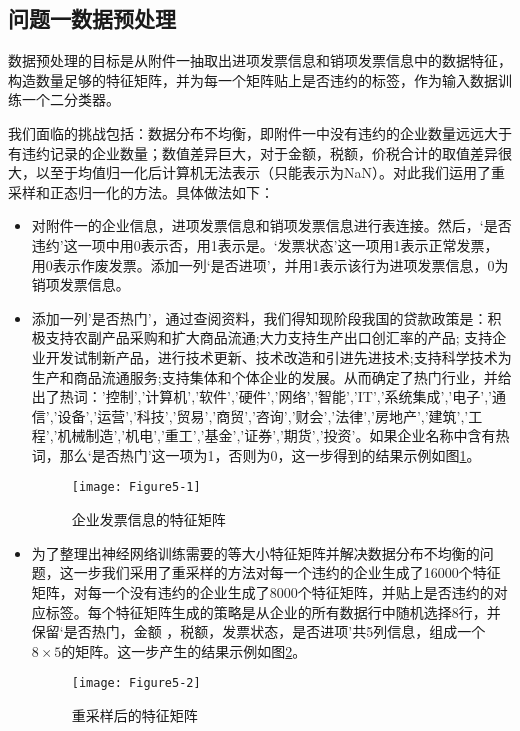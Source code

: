 \documentclass{cumcmthesis}
\begin{document}
\subsection{问题一数据预处理}
数据预处理的目标是从附件一抽取出进项发票信息和销项发票信息中的数据特征，构造数量足够的特征矩阵，并为每一个矩阵贴上是否违约的标签，作为输入数据训练一个二分类器。

我们面临的挑战包括：数据分布不均衡，即附件一中没有违约的企业数量远远大于有违约记录的企业数量；数值差异巨大，对于金额，税额，价税合计的取值差异很大，以至于均值归一化后计算机无法表示（只能表示为NaN）。对此我们运用了重采样和正态归一化的方法。具体做法如下：

\begin{itemize}
    \item  对附件一的企业信息，进项发票信息和销项发票信息进行表连接。然后，‘是否违约’这一项中用0表示否，用1表示是。‘发票状态’这一项用1表示正常发票，用0表示作废发票。添加一列‘是否进项’，并用1表示该行为进项发票信息，0为销项发票信息。
    \item 添加一列'是否热门'，通过查阅资料，我们得知现阶段我国的贷款政策是：积极支持农副产品采购和扩大商品流通;大力支持生产出口创汇率的产品; 支持企业开发试制新产品，进行技术更新、技术改造和引进先进技术;支持科学技术为生产和商品流通服务;支持集体和个体企业的发展。从而确定了热门行业，并给出了热词：'控制','计算机','软件','硬件','网络','智能','IT','系统集成','电子','通信','设备','运营','科技','贸易','商贸','咨询','财会','法律','房地产','建筑','工程','机械制造','机电','重工','基金','证券','期货','投资’。如果企业名称中含有热词，那么‘是否热门’这一项为1，否则为0，这一步得到的结果示例如图\ref{fig51}。
    \begin{figure}[H]
        \centering
        \texttt{[image: Figure5-1]}
        \caption{企业发票信息的特征矩阵}
        \label{fig51}
    \end{figure}
    \item 为了整理出神经网络训练需要的等大小特征矩阵并解决数据分布不均衡的问题，这一步我们采用了重采样的方法对每一个违约的企业生成了16000个特征矩阵，对每一个没有违约的企业生成了8000个特征矩阵，并贴上是否违约的对应标签。每个特征矩阵生成的策略是从企业的所有数据行中随机选择8行，并保留‘是否热门，金额 ，税额，发票状态，是否进项’共5列信息，组成一个$8 \times 5$的矩阵。这一步产生的结果示例如图\ref{fig52}。
    \begin{figure}[H]
        \centering
        \texttt{[image: Figure5-2]}
        \caption{重采样后的特征矩阵}
        \label{fig52}
    \end{figure}

\end{itemize}
\end{document}
